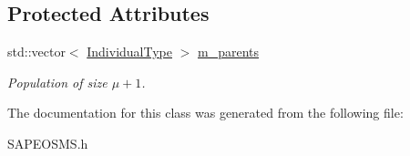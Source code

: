 \subsection*{Protected Attributes}
\begin{DoxyCompactItemize}
\item 
std\+::vector$<$ \hyperlink{classUncertainIndividual}{Individual\+Type} $>$ \hyperlink{classSAPEOSMS_aa51fa3edcebaec4f6b2550d7103a0243}{m\+\_\+parents}\hypertarget{classSAPEOSMS_aa51fa3edcebaec4f6b2550d7103a0243}{}\label{classSAPEOSMS_aa51fa3edcebaec4f6b2550d7103a0243}

\begin{DoxyCompactList}\small\item\em Population of size $\mu + 1$. \end{DoxyCompactList}\end{DoxyCompactItemize}


The documentation for this class was generated from the following file\+:\begin{DoxyCompactItemize}
\item 
S\+A\+P\+E\+O\+S\+M\+S.\+h\end{DoxyCompactItemize}
